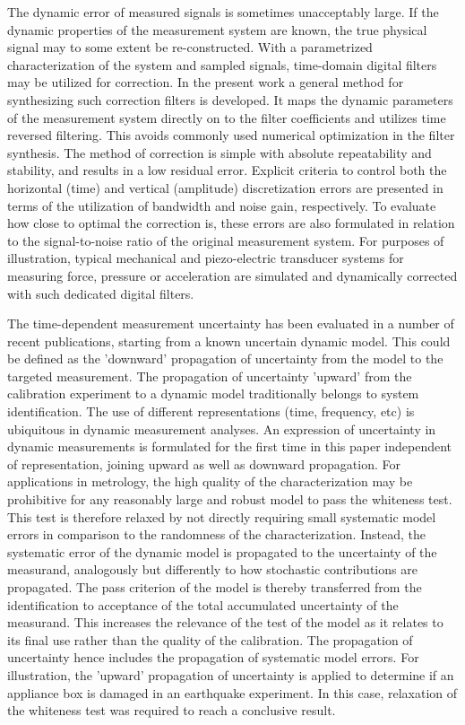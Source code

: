 \documentclass[11pt]{article}
\begin{document}
\citet{Hessling08a} The dynamic error of measured signals is sometimes unacceptably large. If the dynamic properties of the measurement system are known, the true physical signal may to some extent be re-constructed. With a parametrized characterization of the system and sampled signals, time-domain digital filters may be utilized for correction. In the present work a general method for synthesizing such correction filters is developed. It maps the dynamic parameters of the measurement system directly on to the filter coefficients and utilizes time reversed filtering. This avoids commonly used numerical optimization in the filter synthesis. The method of correction is simple with absolute repeatability and stability, and results in a low residual error. Explicit criteria to control both the horizontal (time) and vertical (amplitude) discretization errors are presented in terms of the utilization of bandwidth and noise gain, respectively. To evaluate how close to optimal the correction is, these errors are also formulated in relation to the signal-to-noise ratio of the original measurement system. For purposes of illustration, typical mechanical and piezo-electric transducer systems for measuring force, pressure or acceleration are simulated and dynamically corrected with such dedicated digital filters.

\citet{Hessling11} The time-dependent measurement uncertainty has been evaluated in a number of recent publications, starting from a known uncertain dynamic model. This could be defined as the 'downward' propagation of uncertainty from the model to the targeted measurement. The propagation of uncertainty 'upward' from the calibration experiment to a dynamic model traditionally belongs to system identification. The use of different representations (time, frequency, etc) is ubiquitous in dynamic measurement analyses. An expression of uncertainty in dynamic measurements is formulated for the first time in this paper independent of representation, joining upward as well as downward propagation. For applications in metrology, the high quality of the characterization may be prohibitive for any reasonably large and robust model to pass the whiteness test. This test is therefore relaxed by not directly requiring small systematic model errors in comparison to the randomness of the characterization. Instead, the systematic error of the dynamic model is propagated to the uncertainty of the measurand, analogously but differently to how stochastic contributions are propagated. The pass criterion of the model is thereby transferred from the identification to acceptance of the total accumulated uncertainty of the measurand. This increases the relevance of the test of the model as it relates to its final use rather than the quality of the calibration. The propagation of uncertainty hence includes the propagation of systematic model errors. For illustration, the 'upward' propagation of uncertainty is applied to determine if an appliance box is damaged in an earthquake experiment. In this case, relaxation of the whiteness test was required to reach a conclusive result.
\end{document}

